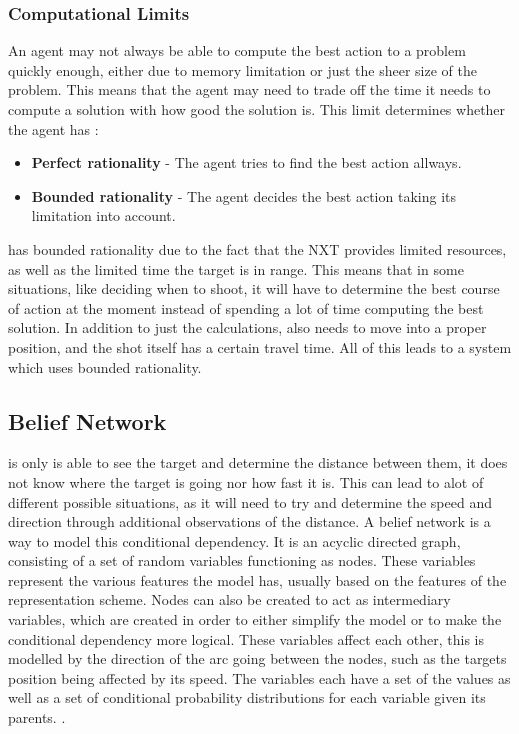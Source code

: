 \subsubsection{Computational Limits}
An agent may not always be able to compute the best action to a problem quickly
enough, either due to memory limitation or just the sheer size of the problem.
This means that the agent may need to trade off the time it needs to compute a
solution with how good the solution is. This limit determines whether the agent
has \citep[ch.1.5.8]{MIBook}:

\begin{itemize}
  \item \textbf{Perfect rationality} - The agent tries to find the best action
  allways.
  \item \textbf{Bounded rationality} - The agent decides the best action taking
  its limitation into account.
\end{itemize}

\name has bounded rationality due to the fact that the NXT provides limited
resources, as well as the limited time the target is in range. This means that
in some situations, like deciding when to shoot, it will have to determine the
best course of action at the moment instead of spending a lot of time computing
the best solution. In addition to just the calculations, \name also needs to
move into a proper position, and the shot itself has a certain travel time. All
of this leads to a system which uses bounded rationality.

\subsection{Belief Network}
\name is only is able to see the
target and determine the distance between them, it does not know where the
target is going nor how fast it is. This can lead to alot of different possible
situations, as it will need to try and determine the speed and direction through
additional observations of the distance. A belief network is a way to model
this conditional dependency. It is an acyclic directed graph, consisting of a
set of random variables functioning as nodes. These variables represent the
various features the model has, usually based on the features of
the representation scheme. Nodes can also be created to act as
intermediary variables, which are created in order to either simplify the model
or to make the conditional dependency more logical. These variables affect each
other, this is modelled by the direction of the arc going between the nodes,
such as the targets position being affected by its speed. The variables each
have a set of the values as well as a set of conditional probability
distributions for each variable given its parents. \citep[ch.6.3]{MIBook}.

